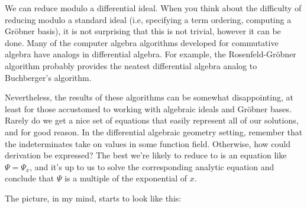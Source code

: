 \documentclass{article}
\begin{document}
We can reduce modulo a differential ideal.  When you think about the difficulty
of reducing modulo a standard ideal (i.e, specifying a term ordering,
computing a Gr\"obner basis), it is not surprising that this is
not trivial, however it can be done.
Many of the computer algebra algorithms developed for commutative algebra have analogs
in differential algebra.  For example, the Rosenfeld-Gr\"obner algorithm probably
provides the neatest differential algebra analog to Buchberger's algorithm.

Nevertheless, the results of these algorithms can be somewhat disappointing,
at least for those accustomed to working with algebraic ideals and Gr\"obner bases.
Rarely do we get a nice set of equations that easily represent all of our solutions,
and for good reason.  In the differential algebraic geometry setting, remember that the indeterminates
take on values in some function field.  Otherwise, how could derivation be expressed?
The best we're likely to reduce to is an equation like $\Psi=\Psi_x$, and it's up to us
to solve the corresponding analytic equation and conclude that $\Psi$ is a multiple of the exponential of $x$.

The picture, in my mind, starts to look like this:
\end{document}
